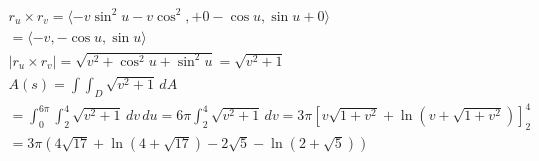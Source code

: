 \documentclass[12pt]{exam}
\begin{document}
\begin{questions}
    \begin{solution}
        \begin{gather*}
            r_u \times r_v = \langle -v \sin^2 u - v \cos^2, + 0 - \cos u, \sin u + 0 \rangle \\
            = \langle -v, - \cos u, \sin u \rangle \\
            |r_u \times r_v| = \sqrt{v^2 + \cos^2 u + \sin^2 u} = \sqrt{v^2 + 1}\\
            A(s) = \int\int_D \sqrt{v^2 + 1} \, dA \\
            = \int_{0}^{6\pi} \int_{2}^{4} \sqrt{v^2 + 1}\, dv\, du = 6\pi \int_{2}^{4} \sqrt{v^2 + 1}\, dv
            = 3\pi \left[v\sqrt{1+v^2} + \ln(v + \sqrt{1+v^2}) \right]_2^4 \\
            = \boxed{ 3\pi(4\sqrt{17} + \ln(4 + \sqrt{17}) - 2\sqrt{5} - \ln(2 + \sqrt{5})) } \tag*{\qed}
        \end{gather*}
    \end{solution}

\end{questions}
\end{document}
